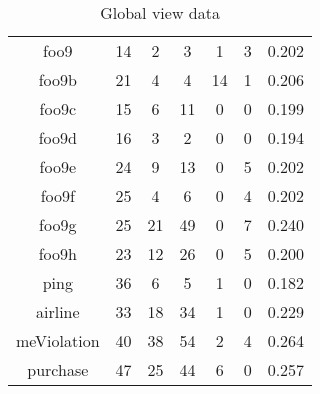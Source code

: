 \begin{table}[h]
\begin{tabular}{|c|c|c|c|c|c|c|}
    foo9 & 14 & 2 & 3 & 1 & 3 & 0.202 \\ 
    foo9b & 21 & 4 & 4 & 14 & 1 & 0.206 \\ 
    foo9c & 15 & 6 & 11 & 0 & 0 & 0.199 \\ 
    foo9d & 16 & 3 & 2 & 0 & 0 & 0.194 \\ 
    foo9e & 24 & 9 & 13 & 0 & 5 & 0.202 \\ 
    foo9f & 25 & 4 & 6 & 0 & 4 & 0.202 \\ 
    foo9g & 25 & 21 & 49 & 0 & 7 & 0.240 \\ 
    foo9h & 23 & 12 & 26 & 0 & 5 & 0.200 \\ 
    ping & 36 & 6 & 5 & 1 & 0 & 0.182 \\ 
    airline & 33 & 18 & 34 & 1 & 0 & 0.229 \\ 
    meViolation & 40 & 38 & 54 & 2 & 4 & 0.264 \\ 
    purchase & 47 & 25 & 44 & 6 & 0 & 0.257 \\ 
    \hline
    \end{tabular}
    \caption{Global view data}
\end{table}